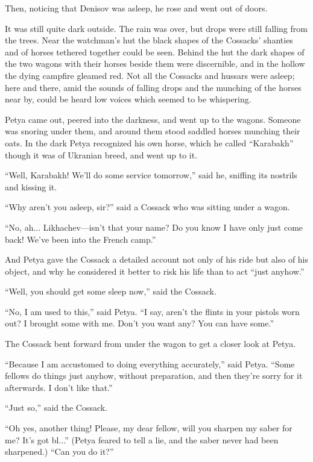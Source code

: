 Then, noticing that Denisov was asleep, he rose and went out of
doors.

It was still quite dark outside. The rain was over, but drops
were still falling from the trees. Near the watchman's hut the
black shapes of the Cossacks' shanties and of horses tethered
together could be seen. Behind the hut the dark shapes of the two
wagons with their horses beside them were discernible, and in the
hollow the dying campfire gleamed red. Not all the Cossacks and
hussars were asleep; here and there, amid the sounds of falling
drops and the munching of the horses near by, could be heard low
voices which seemed to be whispering.

Petya came out, peered into the darkness, and went up to the
wagons.  Someone was snoring under them, and around them stood
saddled horses munching their oats. In the dark Petya recognized
his own horse, which he called ``Karabakh'' though it was of
Ukranian breed, and went up to it.

``Well, Karabakh! We'll do some service tomorrow,'' said he,
sniffing its nostrils and kissing it.

``Why aren't you asleep, sir?'' said a Cossack who was sitting
under a wagon.

``No, ah... Likhachev---isn't that your name? Do you know I have
only just come back! We've been into the French camp.''

And Petya gave the Cossack a detailed account not only of his
ride but also of his object, and why he considered it better to
risk his life than to act ``just anyhow.''

``Well, you should get some sleep now,'' said the Cossack.

``No, I am used to this,'' said Petya. ``I say, aren't the flints
in your pistols worn out? I brought some with me. Don't you want
any? You can have some.''

The Cossack bent forward from under the wagon to get a closer
look at Petya.

``Because I am accustomed to doing everything accurately,'' said
Petya.  ``Some fellows do things just anyhow, without
preparation, and then they're sorry for it afterwards. I don't
like that.''

``Just so,'' said the Cossack.

``Oh yes, another thing! Please, my dear fellow, will you sharpen
my saber for me? It's got bl...'' (Petya feared to tell a lie,
and the saber never had been sharpened.) ``Can you do it?''

